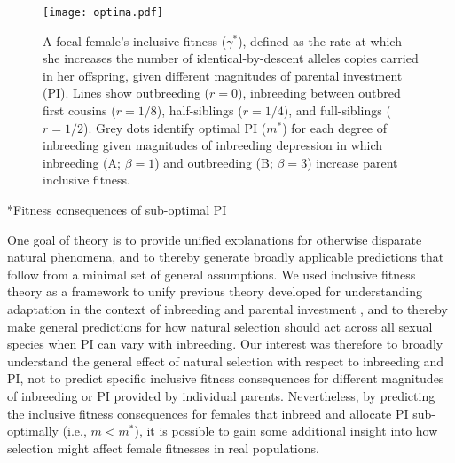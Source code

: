 \documentclass[12pt]{article}
\makeatletter
\renewcommand\section{\@startsection{section}{1}{0in}{-0.5\baselineskip}{0.1\baselineskip}{\normalfont\large\bfseries}}
\makeatother
\begin{document}
\begin{figure}[H]
\begin{center}				
\texttt{[image: optima.pdf]}
\end{center}
\caption{A focal female's inclusive fitness ($\gamma^{*}$), defined as the rate at which she increases the number of identical-by-descent alleles copies carried in her offspring, given different magnitudes of parental investment (PI). Lines show outbreeding ($r=0$), inbreeding between outbred first cousins ($r=1/8$), half-siblings ($r=1/4$), and full-siblings ($r=1/2$). Grey dots identify optimal PI ($m^{*}$) for each degree of inbreeding given magnitudes of inbreeding depression in which inbreeding (A; $\beta=1$) and outbreeding (B; $\beta=3$) increase parent inclusive fitness.}
\label{optima}
\end{figure}

\clearpage

\section*{Fitness consequences of sub-optimal PI}


\noindent One goal of theory is to provide unified explanations for otherwise disparate natural phenomena, and to thereby generate broadly applicable predictions that follow from a minimal set of general assumptions. We used inclusive fitness theory as a framework to unify previous theory developed for understanding adaptation in the context of inbreeding \cite[][]{Parker1979, Parker2006} and parental investment \cite[e.g.,][]{Macnair1978, Parker1978}, and to thereby make general predictions for how natural selection should act across all sexual species when PI can vary with inbreeding. Our interest was therefore to broadly understand the general effect of natural selection with respect to inbreeding and PI, not to predict specific inclusive fitness consequences for different magnitudes of inbreeding or PI provided by individual parents. Nevertheless, by predicting the inclusive fitness consequences for females that inbreed and allocate PI sub-optimally (i.e., $m < m^{*}$), it is possible to gain some additional insight into how selection might affect female fitnesses in real populations. 
\end{document}
